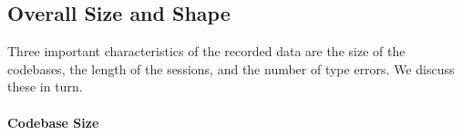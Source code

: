 \documentclass[english,submission,cleveref]{programming}
\begin{document}


\subsection{Overall Size and Shape}

Three important characteristics of the recorded data are the size of the codebases,
the length of the sessions, and the number of type
errors.
We discuss these in turn.


\paragraph{Codebase Size}
\end{document}
